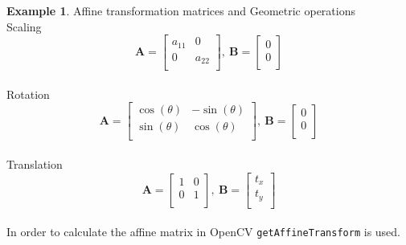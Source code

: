 \documentclass{article}
\theoremstyle{definition}
\newtheorem{ex}{Example}[subsection]
\theoremstyle{remark}
\begin{document}
\begin{ex} Affine transformation matrices and Geometric operations\\

\noindent Scaling \\
\begin{equation*}
    \pmb{A} =
    \begin{bmatrix}
	a_{11} & 0 \\
	0 & a_{22} \\
    \end{bmatrix}
    ,\ 
    \pmb{B} = 
    \begin{bmatrix}
	0 \\
	0 \\
    \end{bmatrix}
\end{equation*} \\

\noindent Rotation \\
\begin{equation*}
    \pmb{A} =
    \begin{bmatrix}
	\cos(\theta) & -\sin(\theta) \\
	\sin(\theta) & \cos(\theta) \\
    \end{bmatrix}
    ,\
    \pmb{B} = 
    \begin{bmatrix}
	0 \\
	0 \\
    \end{bmatrix}
\end{equation*} \\

\noindent Translation \\
\begin{equation*}
    \pmb{A} =
    \begin{bmatrix}
	1 & 0 \\
	0 & 1 \\
    \end{bmatrix}
    ,\ 
    \pmb{B} = 
    \begin{bmatrix}
	t_x \\
	t_y \\
    \end{bmatrix}
\end{equation*}\\

\noindent In order to calculate the affine matrix in OpenCV \lstinline{getAffineTransform} is used.\\


\end{ex}
\end{document}
